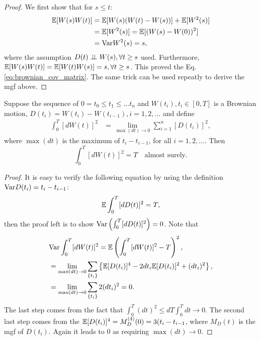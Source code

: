 \begin{proof}
We first show that for $s\le t$:
\begin{equation}
\begin{aligned}
\mathbb{E}[W(s)W(t)]&=\mathbb{E}[W(s)(W(t)-W(s))]+\mathbb{E}[W^2(s)]\\
&=\mathbb{E}[W^2(s)]=\mathbb{E}[(W(s)-W(0))^2]\\
&=\text{Var} W^2(s)=s,
\end{aligned}
\end{equation}
where the assumption $D(t)\perp\!\!\!\perp W(s),\forall t\ge s$ used. Furthermore, $\mathbb{E}[W(s)W(t)]=\mathbb{E}[W(t)W(s)]=s,\forall t\ge s$. This proved the Eq.\ref{eq:brownian_cov_matrix}. The same trick can be used repeatly to derive the mgf above.
\end{proof}

\begin{theorem}
Suppose the sequence of $0=t_0\le t_1\le\dots t_n$ and $W(t_i),t_i\in [0,T]$ is a Brownian motion, $D(t_i)=W(t_i)-W(t_{i-1}),i=1,2,\dots$ and define
\begin{equation}
\begin{aligned}
\int_0^T[dW(t)]^2&=\lim_{\max(dt)\to 0}\sum_{i=1}^n[D(t_i)]^2,
\end{aligned}
\end{equation}
where $\max(dt)$ is the maximum of $t_i-t_{i-1}$, for all $i=1,2,\dots$. Then
\begin{equation}
\int_0^T[dW(t)]^2 = T \quad\text{almost surely.}
\end{equation}
\end{theorem}

\begin{proof}
It is easy to verify the following equation by using the definition $\text{Var} D(t_i)=t_i-t_{i-1}$:
\begin{equation}
\mathbb{E} \int_0^T[dD(t)]^2=T,
\end{equation}
then the proof left is to show $\text{Var}\left(\int_0^T[dD(t)]^2\right)=0$. Note that
\begin{equation*}
\begin{aligned}
&\text{Var}\int_0^T[dW(t)]^2=\mathbb{E}\left(\int_0^T[dW(t)]^2-T\right)^2,\\
&=\lim_{\max(dt)\to0} \sum_{\{t_i\}}\left\{\mathbb{E} [D(t_i)]^4-2dt_i\mathbb{E} [D(t_i)]^2+(dt_i)^2\right\},\\
&=\lim_{\max(dt)\to0} \sum_{\{t_i\}}2(dt_i)^2=0.
\end{aligned}
\end{equation*}
The last step comes from the fact that $\int_0^T (dt)^2\le dT\int_0^T dt\to0$. The second last step comes from the $\mathbb{E} [D(t_i)]^4=M_D^{(4)}(0)=3(t_i-t_{i-1}$, where $M_D(t)$ is the mgf of $D(t_i)$. Again it leads to 0 as requiring $\max(dt)\to0$.
\end{proof}